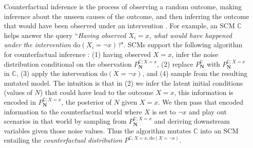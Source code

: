 \documentclass{article}
\begin{document}


 Counterfactual inference is the process of observing a random outcome, making inference about the unseen causes of the outcome, and then inferring the outcome that would have been observed under an intervention \cite{peters2017elements, roese1997counterfactual}. For example, an SCM $\mathbb{C}$ helps answer the query ``\emph{Having observed $X_i = x$, what would have happened under the intervention $\text{do}(X_i = \neg x)$?}". SCMs support the following algorithm for counterfactual inference  \cite{Balke:1994:CPC:2074394.2074401}: (1) having observed $X = x$, infer the noise distribution conditional on the observation $P_{\mathbf{N}}^{\mathbb{C}; X=x}$, (2) replace $P_{\mathbf{N}}^{\mathbb{C}}$ with $P_{\mathbf{N}}^{\mathbb{C}; X=x}$ in $\mathbb{C}$, (3) apply the intervention $\text{do}(X = \neg x)$, and (4) sample from the resulting mutated model.  The intuition is that in (2) we infer the latent initial conditions (values of $N$) that could have lead to the outcome $X = x$, this information is encoded in $P_{\mathbf{N}}^{\mathbb{C}; X=x}$, the posterior of $N$ given $X = x$.  We then pass that encoded information to the counterfactual world where $X$ is set to $\neg x$ and play out scenarios in that world by sampling from $P_{\mathbf{N}}^{\mathbb{C}; X=x}$ and deriving downstream variables given those noise values. Thus the algorithm mutates $\mathbb{C}$ into an SCM entailing the \emph{counterfactual distribution} $P^{\mathbb{C}; X = x, \text{do} (X = \neg x)}$. 

\end{document}
